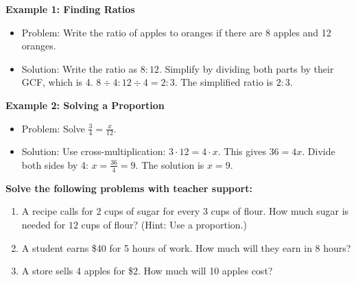 \documentclass[12pt]{article}
\begin{document}
\vspace{1em}

\begin{tcolorbox}[colframe=black!60, colback=white, 
coltitle=black, colbacktitle=black!15, fonttitle=\bfseries\Large, 
title=Examples, halign title=center, left=10pt, right=10pt, top=10pt, bottom=15pt]
\textbf{Example 1: Finding Ratios}
\begin{itemize}
    \item Problem: Write the ratio of apples to oranges if there are 8 apples and 12 oranges.
    \item {Solution: Write the ratio as \( 8:12 \). Simplify by dividing both parts by their GCF, which is 4. \( 8 \div 4 : 12 \div 4 = 2:3 \). The simplified ratio is \( 2:3 \).}
\end{itemize}

\textbf{Example 2: Solving a Proportion}
\begin{itemize}
    \item Problem: Solve \( \frac{3}{4} = \frac{x}{12} \).
    \item {Solution: Use cross-multiplication: \( 3 \cdot 12 = 4 \cdot x \). This gives \( 36 = 4x \). Divide both sides by 4: \( x = \frac{36}{4} = 9 \). The solution is \( x = 9 \).}
\end{itemize}


\end{tcolorbox}

\vspace{1em}

\begin{tcolorbox}[colframe=black!60, colback=white, 
coltitle=black, colbacktitle=black!15, fonttitle=\bfseries\Large, 
title=Guided Practice, halign title=center, left=10pt, right=10pt, top=10pt, bottom=45pt]
\textbf{Solve the following problems with teacher support:}
\begin{enumerate}[itemsep=3em]
    \item A recipe calls for \( 2 \) cups of sugar for every \( 3 \) cups of flour. How much sugar is needed for \( 12 \) cups of flour? (Hint: Use a proportion.)
    \item A student earns \$40 for 5 hours of work. How much will they earn in 8 hours?
    \item A store sells 4 apples for \$2. How much will 10 apples cost?
\end{enumerate}
\end{tcolorbox}

\vspace{1em}
\end{document}
